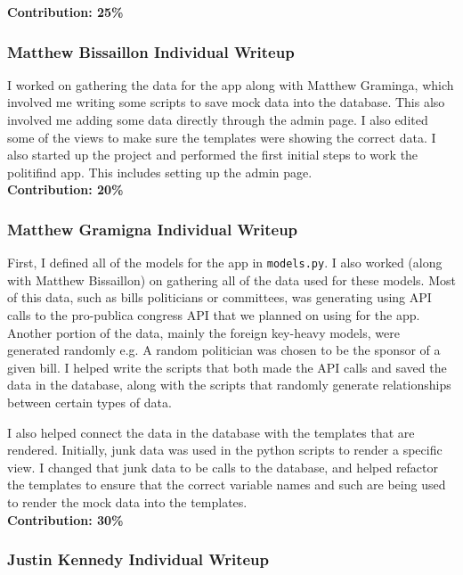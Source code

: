 \documentclass{article}
\newcommand{\n}{\noindent}
\begin{document}
\n\textbf{Contribution: 25\%}

\pagebreak

\subsubsection*{Matthew Bissaillon Individual Writeup}
I worked on gathering the data for the app along with Matthew Graminga, which involved me writing some scripts to save mock data into the database. This also involved me adding some data directly through the admin page. I also edited some of the views to make sure the templates were showing the correct data. I also started up the project and performed the first initial steps to work the politifind app. This includes setting up the admin page. \\

\n\textbf{Contribution: 20\%}
\pagebreak

\subsubsection*{Matthew Gramigna Individual Writeup}

First, I defined all of the models for the app in \verb|models.py|. I also worked (along with Matthew Bissaillon) on gathering all of the data used for these models. Most of this data, such as bills politicians or committees, was generating using API calls to the pro-publica congress API that we planned on using for the app.  Another portion of the data, mainly the foreign key-heavy models, were generated randomly e.g. A random politician was chosen to be the sponsor of a given bill. I helped write the scripts that both made the API calls and saved the data in the database, along with the scripts that randomly generate relationships between certain types of data.

I also helped connect the data in the database with the templates that are rendered. Initially, junk data was used in the python scripts to render a specific view. I changed that junk data to be calls to the database, and helped refactor the templates to ensure that the correct variable names and such are being used to render the mock data into the templates. \\

\n\textbf{Contribution: 30\%}

\pagebreak

\subsubsection*{Justin Kennedy Individual Writeup}
\end{document}
